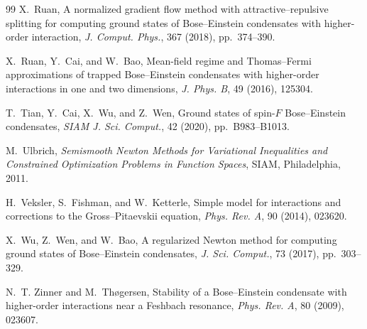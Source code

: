 \documentclass[11pt]{article}
\theoremstyle{plain}
\theoremstyle{definition}
\numberwithin{equation}{section}
\begin{document}
\begin{thebibliography}{99}
X.~Ruan,
\newblock A normalized gradient flow method with
attractive--repulsive splitting for computing ground states of
Bose--Einstein condensates with higher-order interaction,
\newblock \emph{J. Comput. Phys.}, 367 (2018), pp.~374--390.

X.~Ruan, Y.~Cai, and W.~Bao,
\newblock Mean-field regime and Thomas--Fermi approximations of
trapped Bose--Einstein condensates with higher-order interactions in
one and two dimensions,
\newblock \emph{J. Phys. B}, 49 (2016), 125304.

T.~Tian, Y.~Cai, X.~Wu, and Z.~Wen,
\newblock Ground states of spin-$F$ Bose--Einstein condensates,
\newblock \emph{SIAM J. Sci. Comput.}, 42 (2020), pp.~B983--B1013.

M.~Ulbrich,
\newblock \emph{Semismooth Newton Methods for Variational Inequalities and
Constrained Optimization Problems in Function Spaces},
\newblock SIAM, Philadelphia, 2011.

H.~Veksler, S.~Fishman, and W.~Ketterle,
\newblock Simple model for interactions and corrections to the
Gross--Pitaevskii equation,
\newblock \emph{Phys. Rev. A}, 90 (2014), 023620.

X.~Wu, Z.~Wen, and W.~Bao,
\newblock A regularized Newton method for computing ground states of
Bose--Einstein condensates,
\newblock \emph{J. Sci. Comput.}, 73 (2017), pp.~303--329.

N.~T. Zinner and M.~Th{\o}gersen,
\newblock Stability of a Bose--Einstein condensate with higher-order
interactions near a Feshbach resonance,
\newblock \emph{Phys. Rev. A}, 80 (2009), 023607.

\end{thebibliography}
\end{document}
